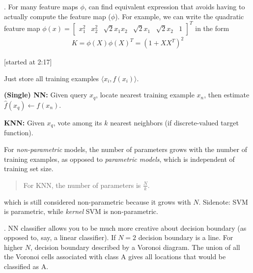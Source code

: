 \documentclass[12pt]{article}
\newcommand{\myspace}{\vspace{2\bigskipamount}}
\newcommand\p{\Needspace{10\baselineskip} \noindent}
\begin{document}
\myspace
\p {}. For many feature maps $\phi$, can find equivalent expression that avoids having to actually compute the feature map ($\phi$). For example, we can write the quadratic feature map $\phi(x) = \begin{bmatrix} x_1^2 & x_2^2 & \sqrt{2}x_1x_2 & \sqrt{2} x_1 & \sqrt{2}x_2 & 1\end{bmatrix}^T$ in the form
\begin{align}
 K = \phi(X)\phi(X)^T = (1 + XX^T)^2
\end{align}








[started at 2:17]


\p {} Just store all training examples $\langle x_i, f(x_i)\rangle$. 
\begin{compactitem}
	\item \textbf{(Single) NN:} Given query $x_q$, locate nearest training example $x_n$, then estimate $\hat f(x_q) \leftarrow f(x_n)$. 
	\item \textbf{KNN:} Given $x_q$, vote among its $k$ nearest neighbors (if discrete-valued target function). 
\end{compactitem}

\myspace
\p {} For \textit{non-parametric} models, the number of parameters grows with the number of training examples, as opposed to \textit{parametric models}, which is independent of training set size. 
\begin{quote}
	For KNN, the number of parameters is $\frac{N}{k}$. 
\end{quote}
which is still considered non-parametric because it grows with $N$. Sidenote: SVM is parametric, while \textit{kernel} SVM is non-parametric. 


\myspace
\p {}. NN classifier allows you to be much more creative about decision boundary (as opposed to, say, a linear classifier). If $N = 2$ decision boundary is a line. For higher $N$, decision boundary described by a Voronoi diagram. The union of all the Voronoi cells associated with class A gives all locations that would be classified as A. 
\end{document}

